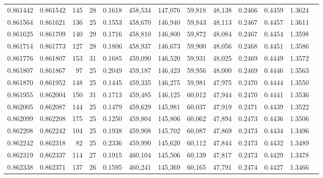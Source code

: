 \begin{tabular}{rrrrrrrrrrrrr}
0.861442 & 0.861542 &   145 &  28 &                                     0.1618 & 458,534 & 147,076 &  59,818 &  48,138 & 0.2466 & 0.4459 & 1.3624 \\
0.861564 & 0.861621 &   136 &  25 &                                     0.1553 & 458,670 & 146,940 &  59,843 &  48,113 & 0.2467 & 0.4457 & 1.3611 \\
0.861625 & 0.861709 &   140 &  29 &                                     0.1716 & 458,810 & 146,800 &  59,872 &  48,084 & 0.2467 & 0.4454 & 1.3598 \\
0.861714 & 0.861773 &   127 &  28 &                                     0.1806 & 458,937 & 146,673 &  59,900 &  48,056 & 0.2468 & 0.4451 & 1.3586 \\
0.861776 & 0.861807 &   153 &  31 &                                     0.1685 & 459,090 & 146,520 &  59,931 &  48,025 & 0.2469 & 0.4449 & 1.3572 \\
0.861807 & 0.861867 &    97 &  25 &                                     0.2049 & 459,187 & 146,423 &  59,956 &  48,000 & 0.2469 & 0.4446 & 1.3563 \\
0.861870 & 0.861952 &   148 &  25 &                                     0.1445 & 459,335 & 146,275 &  59,981 &  47,975 & 0.2470 & 0.4444 & 1.3550 \\
0.861955 & 0.862004 &   150 &  31 &                                     0.1713 & 459,485 & 146,125 &  60,012 &  47,944 & 0.2470 & 0.4441 & 1.3536 \\
0.862005 & 0.862087 &   144 &  25 &                                     0.1479 & 459,629 & 145,981 &  60,037 &  47,919 & 0.2471 & 0.4439 & 1.3522 \\
0.862099 & 0.862208 &   175 &  25 &                                     0.1250 & 459,804 & 145,806 &  60,062 &  47,894 & 0.2473 & 0.4436 & 1.3506 \\
0.862208 & 0.862242 &   104 &  25 &                                     0.1938 & 459,908 & 145,702 &  60,087 &  47,869 & 0.2473 & 0.4434 & 1.3496 \\
0.862242 & 0.862318 &    82 &  25 &                                     0.2336 & 459,990 & 145,620 &  60,112 &  47,844 & 0.2473 & 0.4432 & 1.3489 \\
0.862319 & 0.862337 &   114 &  27 &                                     0.1915 & 460,104 & 145,506 &  60,139 &  47,817 & 0.2473 & 0.4429 & 1.3478 \\
0.862338 & 0.862371 &   137 &  26 &                                     0.1595 & 460,241 & 145,369 &  60,165 &  47,791 & 0.2474 & 0.4427 & 1.3466 \\

\end{tabular}
